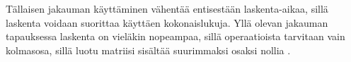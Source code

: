 Tällaisen jakauman käyttäminen vähentää entisestään laskenta-aikaa, sillä laskenta voidaan suorittaa käyttäen kokonaislukuja. Yllä olevan jakauman tapauksessa laskenta on vieläkin nopeampaa, sillä operaatioista
tarvitaan vain kolmasosa, sillä luotu matriisi sisältää suurimmaksi osaksi nollia \cite{Random}.

%
%
%
%
%
%
%
%
%
